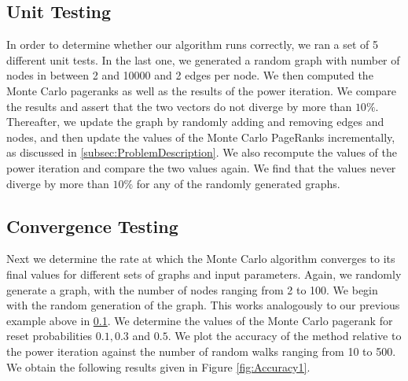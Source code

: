\documentclass[twocolumn]{article}
\theoremstyle{definition}
\theoremstyle{theorem}
\begin{document}
\subsection{Unit Testing}
\label{subsec:UnitTesting}
In order to determine whether our algorithm runs correctly, we ran a set of 5 different unit tests. In the last one, we generated a random graph with number of nodes in between 2 and 10000 and 2 edges per node. We then computed the Monte Carlo pageranks as well as the results of the power iteration. We compare the results and assert that the two vectors do not diverge by more than $10\%$. Thereafter, we update the graph by randomly adding and removing edges and nodes, and then update the values of the Monte Carlo PageRanks incrementally, as discussed in \ref{subsec:ProblemDescription}. We also recompute the values of the power iteration and compare the two values again. We find that the values never diverge by more than $10\%$ for any of the randomly generated graphs. 
\subsection{Convergence Testing}
\label{subsec:ConvergenceTesting}
Next we determine the rate at which the Monte Carlo algorithm converges to its final values for different sets of graphs and input parameters. Again, we randomly generate a graph, with the number of nodes ranging from 2 to 100. We begin with the random generation of the graph. This works analogously to our previous example above in \ref{subsec:UnitTesting}. We determine the values of the Monte Carlo pagerank for reset probabilities $0.1, 0.3$ and $0.5$. We plot the accuracy of the method relative to the power iteration against the number of random walks ranging from 10 to 500. We obtain the following results given in Figure \ref{fig:Accuracy1}. \vspace{1em}\\
\end{document}
